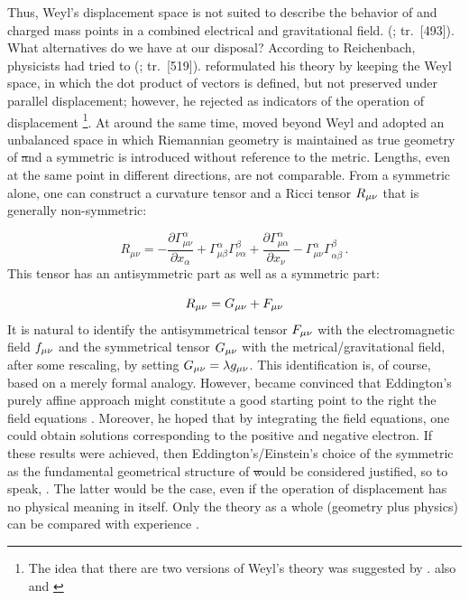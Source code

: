 \documentclass[submitted]{article}
\newcommand{\faradaymn}{\ensuremath{f\mn}}
\renewcommand{\rzlap}[2]{(\cite[#1]{Reichenbach1928}; tr.\ [#2])\xspace}
\begin{document}
Thus, Weyl's displacement space is not suited to describe the behavior of \rac and charged mass points in a combined electrical and gravitational field.  \rzlap{353}{493}. What alternatives do we have at our disposal? According to Reichenbach, physicists had tried to  \rzlap{371}{519}. \citet{Weyl1921} reformulated his theory by keeping the  Weyl space, in which the dot product of vectors is defined, but not preserved under parallel displacement; however, he rejected \rac as indicators of the operation of displacement \Gtmn\footnote{The idea that there are two versions of Weyl's theory was suggested by \cite{Pauli1921a}. \Cf also \citep{Weyl1921e} and \citep[367--368]{Reichenbach1921}}. At around the same time, \citet{Eddington1921} moved beyond Weyl and adopted an unbalanced space in which Riemannian geometry is maintained as true geometry of \st and a symmetric \Gtmn is introduced without reference to the metric. Lengths, even at the same point in different directions, are not comparable. From a symmetric \Gtmn alone, one can construct a curvature tensor \ritea and a Ricci tensor $R_{\mu\nu}$ that is generally non-symmetric:

\begin{equation*}
R_{\mu \nu}=-\frac{\partial \Gamma_{\mu \nu}^{\alpha}}{\partial x_{\alpha}}+\Gamma_{\mu \beta}^{\alpha} \Gamma_{\nu \alpha}^{\beta}+\frac{\partial \Gamma_{\mu \alpha}^{\alpha}}{\partial x_{\nu}}-\Gamma_{\mu \nu}^{\alpha} \Gamma_{\alpha \beta}^{\beta}\,.
\end{equation*}
%
This tensor has an antisymmetric part as well as a symmetric part:

\begin{equation*}
R_{\mu\nu}=G_{\mu\nu}+ F_{\mu\nu}
\end{equation*}
%
It is natural to identify the antisymmetrical tensor $F_{\mu\nu}$ with the electromagnetic field $\faradaymn$ and the symmetrical tensor $G_{\mu\nu}$ with the metrical/gravitational field, after some rescaling, by setting $G_{\mu\nu}=\lambda g_{\mu\nu}$. This identification is, of course, based on a merely formal analogy. However, \citet{Einstein1923c,Einstein1923d,Einstein1925d} became convinced that Eddington's purely affine approach might constitute a good starting point to  the right the field equations . Moreover, he hoped that by integrating the field equations, one could obtain solutions corresponding to the positive and negative electron. If these results were achieved, then Eddington's/Einstein's choice of the symmetric \Gtmn as the fundamental geometrical structure of \st would be considered justified, so to speak, . The latter would be the case, even if the operation of displacement has no physical meaning in itself. Only the theory as a whole (geometry plus physics) can be compared with experience \citet{Einstein1921b,Einstein1924,Einstein1926}.
\end{document}
